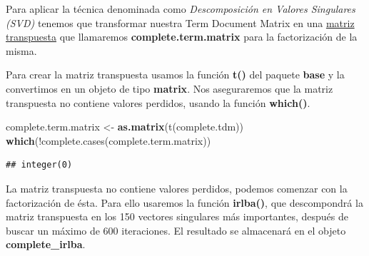 \documentclass[]{article}
\newenvironment{Shaded}{\begin{snugshade}}{\end{snugshade}}
\newcommand{\DataTypeTok}[1]{\textcolor[rgb]{0.13,0.29,0.53}{#1}}
\newcommand{\DecValTok}[1]{\textcolor[rgb]{0.00,0.00,0.81}{#1}}
\newcommand{\KeywordTok}[1]{\textcolor[rgb]{0.13,0.29,0.53}{\textbf{#1}}}
\newcommand{\NormalTok}[1]{#1}
\newcommand{\OperatorTok}[1]{\textcolor[rgb]{0.81,0.36,0.00}{\textbf{#1}}}
\newcommand{\StringTok}[1]{\textcolor[rgb]{0.31,0.60,0.02}{#1}}
\begin{document}
Para aplicar la técnica denominada como \emph{Descomposición en Valores Singulares
(SVD)} tenemos que transformar nuestra Term Document Matrix en una \href{https://es.wikipedia.org/wiki/Matriz_transpuesta}{\color{blue}matriz transpuesta} que llamaremos \textbf{complete.term.matrix} para la factorización de la misma. 

Para crear la matriz transpuesta usamos la función \textbf{t()} del paquete \textbf{base} y la convertimos en un objeto de tipo \textbf{matrix}. Nos aseguraremos que la matriz transpuesta no contiene valores perdidos, usando la función \textbf{which()}.

\begin{Shaded}
\begin{Highlighting}[]
\NormalTok{complete.term.matrix <-}\StringTok{ }\KeywordTok{as.matrix}\NormalTok{(t(complete.tdm))}
\KeywordTok{which}\NormalTok{(!complete.cases(complete.term.matrix))}
\end{Highlighting}
\end{Shaded}

\begin{verbatim}
## integer(0)
\end{verbatim}

La matriz transpuesta no contiene valores perdidos, podemos comenzar con la factorización de ésta. Para ello usaremos la función \textbf{irlba()}, que descompondrá la matriz transpuesta en los 150 vectores singulares más importantes, después de buscar un máximo de 600 iteraciones. El resultado se almacenará en el objeto \textbf{complete\_irlba}.

\begin{Shaded}
\end{Shaded}
\end{document}
